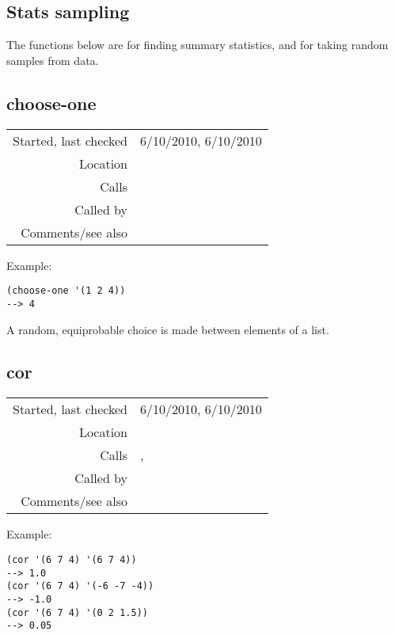 \subsection{Stats sampling}\label{sec:stats-sampling}

The functions below are for finding summary
statistics, and for taking random samples from
data.


\subsection*{choose-one}\label{fun:choose-one}

\vspace{0.3cm}
\begin{tabular}{r|p{8cm}}
Started, last checked & 6/10/2010, 6/10/2010 \\
Location & \nameref{sec:stats-sampling} \\
Calls & \\
Called by & \\
Comments/see also & 
\end{tabular}

\vspace{0.5cm}
\noindent Example:
\begin{verbatim}
(choose-one '(1 2 4))
--> 4
\end{verbatim}

\noindent A random, equiprobable choice is made
between elements of a list.


\subsection*{cor}\label{fun:cor}

\vspace{0.3cm}
\begin{tabular}{r|p{8cm}}
Started, last checked & 6/10/2010, 6/10/2010 \\
Location & \nameref{sec:stats-sampling} \\
Calls & \nameref{fun:fibonacci-list}, \nameref{fun:my-last} \\
Called by & \nameref{fun:key-correlations} \\
Comments/see also & 
\end{tabular}

\vspace{0.5cm}
\noindent Example:
\begin{verbatim}
(cor '(6 7 4) '(6 7 4))
--> 1.0
(cor '(6 7 4) '(-6 -7 -4))
--> -1.0
(cor '(6 7 4) '(0 2 1.5))
--> 0.05
\end{verbatim}


